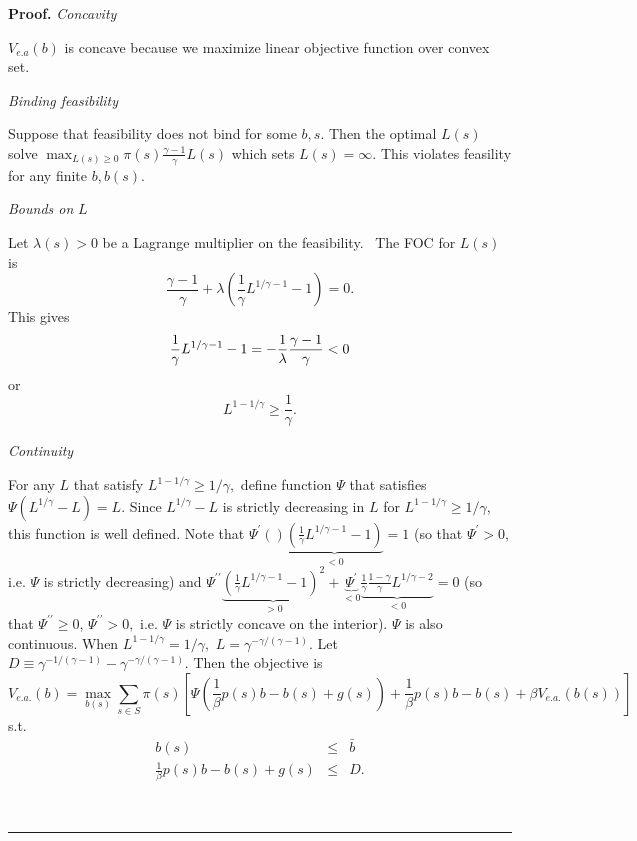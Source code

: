 \documentclass{article}
\newenvironment{proof}[1][Proof]{\noindent\textbf{#1.} }{\ \rule{0.5em}{0.5em}}
\begin{document}
\begin{proof}
\smallskip \textit{Concavity}

$V_{e.a}\left( b\right) $ is concave because we maximize linear objective
function over convex set.

\textit{Binding feasibility}

Suppose that feasibility does not bind for some $b,s.$ Then the optimal $%
L\left( s\right) $ solve $\max_{L\left( s\right) \geq 0}\pi \left( s\right) 
\frac{\gamma -1}{\gamma }L\left( s\right) $ which sets $L\left( s\right)
=\infty .$ This violates feasility for any finite $b,b\left( s\right) .$

\textit{Bounds on }$L$

Let $\lambda \left( s\right) >0$ be a Lagrange multiplier on the
feasibility. \ The FOC for $L\left( s\right) $ is 
\[
\frac{\gamma -1}{\gamma }+\lambda \left( \frac{1}{\gamma }L^{1/\gamma
-1}-1\right) =0. 
\]%
This gives%
\[
\frac{1}{\gamma }L^{1/\gamma -1}-1=-\frac{1}{\lambda }\frac{\gamma -1}{%
\gamma }<0 
\]%
or%
\[
L^{1-1/\gamma }\geq \frac{1}{\gamma }. 
\]

\textit{Continuity}

For any $L$ that satisfy $L^{1-1/\gamma }\geq 1/\gamma ,$ define function $%
\Psi $ that satisfies $\Psi \left( L^{1/\gamma }-L\right) =L.$ Since $%
L^{1/\gamma }-L$ is strictly decreasing in $L$ for $L^{1-1/\gamma }\geq
1/\gamma $, this function is well defined. Note that $\Psi ^{\prime }\left(
{}\right) \underbrace{\left( \frac{1}{\gamma }L^{1/\gamma -1}-1\right) }%
_{<0}=1$ (so that $\Psi ^{\prime }>0$, i.e. $\Psi $ is strictly decreasing)
and $\Psi ^{\prime \prime }\underbrace{\left( \frac{1}{\gamma }L^{1/\gamma
-1}-1\right) ^{2}}_{>0}+\underbrace{\Psi ^{\prime }}_{<0}\underbrace{\frac{1%
}{\gamma }\frac{1-\gamma }{\gamma }L^{1/\gamma -2}}_{<0}=0$ (so that $\Psi
^{\prime \prime }\geq 0$, $\Psi ^{\prime \prime }>0,$ i.e. $\Psi $ is
strictly concave on the interior). $\Psi $ is also continuous. When $%
L^{1-1/\gamma }=1/\gamma ,$ $L=\gamma ^{-\gamma /\left( \gamma -1\right) }.$
Let $D\equiv \gamma ^{-1/\left( \gamma -1\right) }-\gamma ^{-\gamma /\left(
\gamma -1\right) }.$ Then the objective is 
\[
V_{e.a.}\left( b\right) =\max_{b\left( s\right) }\sum_{s\in S}\pi \left(
s\right) \left[ \Psi \left( \frac{1}{\beta }p\left( s\right) b-b\left(
s\right) +g\left( s\right) \right) +\frac{1}{\beta }p\left( s\right)
b-b\left( s\right) +\beta V_{e.a.}\left( b\left( s\right) \right) \right] 
\]%
s.t.%
\begin{eqnarray*}
b\left( s\right) &\leq &\bar{b} \\
\frac{1}{\beta }p\left( s\right) b-b\left( s\right) +g\left( s\right) &\leq
&D.
\end{eqnarray*}


\end{proof}
\end{document}
